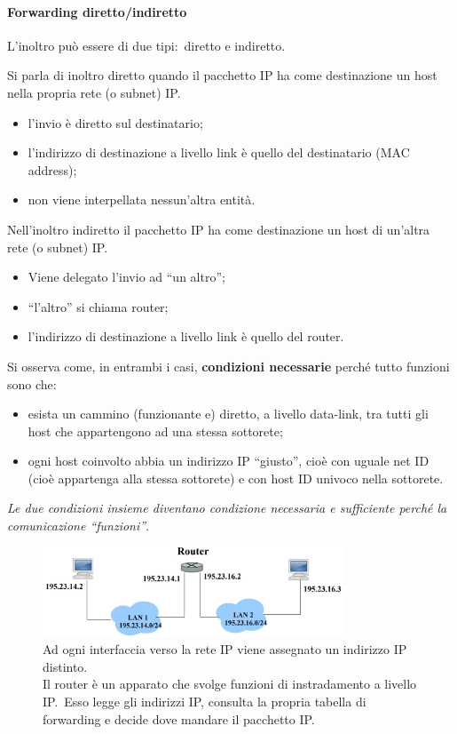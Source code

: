 \paragraph{Forwarding diretto/indiretto}

L'inoltro può essere di due tipi:\ diretto e indiretto.

Si parla di inoltro diretto quando il pacchetto IP ha come destinazione un host nella propria rete (o subnet) IP.
\begin{itemize}
    \item l'invio è diretto sul destinatario;
    \item l'indirizzo di destinazione a livello link è quello del destinatario (MAC address);
    \item non viene interpellata nessun'altra entità.
\end{itemize}
Nell'inoltro indiretto il pacchetto IP ha come destinazione un host di un'altra rete (o subnet) IP.

\begin{itemize}
    \item Viene delegato l'invio ad ``un altro'';
    \item ``l'altro'' si chiama router;
    \item l'indirizzo di destinazione a livello link è quello del router.
\end{itemize}
Si osserva come, in entrambi i casi, \textbf{condizioni necessarie} perché tutto funzioni sono che:

\begin{itemize}
    \item esista un cammino (funzionante e) diretto, a livello data-link, tra tutti gli host che appartengono ad una stessa sottorete;
    \item ogni host coinvolto abbia un indirizzo IP ``giusto'', cioè con uguale net ID (cioè appartenga alla stessa sottorete) e con host ID univoco nella sottorete.
\end{itemize}
\emph{Le due condizioni insieme diventano condizione necessaria e sufficiente per\-ché la comunicazione ``funzioni''}.

\begin{figure}[H]
    \centering
    \includegraphics[width=0.8\textwidth]{immagini/Rete_IP.jpg}
    \caption*{Ad ogni interfaccia verso la rete IP viene assegnato un indirizzo IP distinto.\\ Il router è un apparato che svolge funzioni di instradamento a livello IP.\
        Esso legge gli indirizzi IP, consulta la propria tabella di forwarding e decide dove mandare il pacchetto IP.}
\end{figure}

